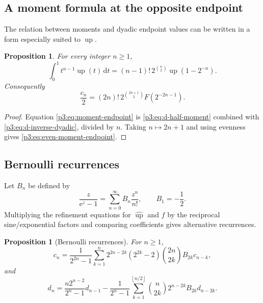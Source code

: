 \documentclass[11pt]{article}
\numberwithin{equation}{section}
\newtheorem{proposition}[theorem]{Proposition}
\theoremstyle{definition}
\theoremstyle{remark}
\newcommand{\upf}{\operatorname{up}}
\newcommand{\dd}{\,\mathrm d}
\newcommand{\e}{\mathrm e}
\newcommand{\floor}[1]{\left\lfloor#1\right\rfloor}
\begin{document}
\subsection{A moment formula at the opposite endpoint}

The relation between moments and dyadic endpoint values can be written in a form especially suited to $\upf$.

\begin{proposition}\label{p3:prop:moment-endpoint}
For every integer $n\ge1$,
\begin{equation}\label{p3:eq:moment-endpoint}
 \int_0^1t^{n-1}\upf(t)\dd t
 =(n-1)!\,2^{\binom n2}\upf(1-2^{-n}).
\end{equation}
Consequently
\begin{equation}\label{p3:eq:even-moment-endpoint}
 \frac{c_n}{2}=(2n)!\,2^{\binom{2n+1}{2}}F(2^{-2n-1}).
\end{equation}
\end{proposition}

\begin{proof}
Equation \eqref{p3:eq:moment-endpoint} is \eqref{p3:eq:d-half-moment} combined with \eqref{p3:eq:d-inverse-dyadic}, divided by $n$.  Taking $n\mapsto2n+1$ and using evenness gives \eqref{p3:eq:even-moment-endpoint}.
\end{proof}

\subsection{Bernoulli recurrences}

Let $B_n$ be defined by
\begin{equation}\label{p3:eq:Bernoulli-gen}
 \frac{z}{\e^z-1}=\sum_{n=0}^{\infty}B_n\frac{z^n}{n!},
 \qquad B_1=-\frac12.
\end{equation}
Multiplying the refinement equations for $\widehat{\upf}$ and $f$ by the reciprocal sine/exponential factors and comparing coefficients gives alternative recurrences.

\begin{proposition}[Bernoulli recurrences]\label{p3:prop:Bernoulli-recurrences}
For $n\ge1$,
\begin{equation}\label{p3:eq:c-Bernoulli}
 c_n=\frac{1}{2^{2n}-1}\sum_{k=1}^{n}
 2^{2n-2k}(2^{2k}-2)\binom{2n}{2k}B_{2k}c_{n-k},
\end{equation}
and
\begin{equation}\label{p3:eq:d-Bernoulli}
 d_n=\frac{n2^{n-2}}{2^n-1}d_{n-1}
 -\frac{1}{2^n-1}\sum_{k=1}^{\floor{n/2}}
 \binom n{2k}2^{n-2k}B_{2k}d_{n-2k}.
\end{equation}
\end{proposition}
\end{document}
